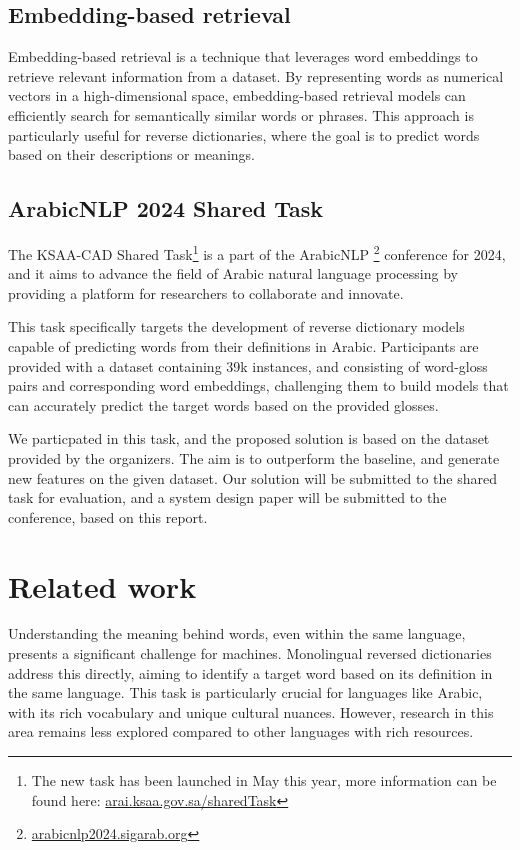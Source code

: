 \documentclass[12.5pt]{article}
\begin{document}
\subsection{Embedding-based retrieval}

Embedding-based retrieval is a technique that leverages word embeddings to retrieve relevant information from a dataset. By representing words as numerical vectors in a high-dimensional space, embedding-based retrieval models can efficiently search for semantically similar words or phrases. This approach is particularly useful for reverse dictionaries, where the goal is to predict words based on their descriptions or meanings.

\subsection{ArabicNLP 2024 Shared Task}\label{sec:arabicnlp}

The KSAA-CAD Shared Task\footnote{The new task has been launched in May this year, more information can be found here: \href{https://arai.ksaa.gov.sa/sharedTask2024/}{arai.ksaa.gov.sa/sharedTask}} is a part of the ArabicNLP \footnote{\href{https://arabicnlp2024.sigarab.org/}{arabicnlp2024.sigarab.org}} conference for 2024, and it aims to advance the field of Arabic natural language processing by providing a platform for researchers to collaborate and innovate. 

This task specifically targets the development of reverse dictionary models capable of predicting words from their definitions in Arabic. Participants are provided with a dataset containing 39k instances, and consisting of word-gloss pairs and corresponding word embeddings, challenging them to build models that can accurately predict the target words based on the provided glosses.

We particpated in this task, and the proposed solution is based on the dataset provided by the organizers. The aim is to outperform the baseline, and generate new features on the given dataset. Our solution will be submitted to the shared task for evaluation, and a system design paper will be submitted to the conference, based on this report.

\newpage

\section{Related work}

Understanding the meaning behind words, even within the same language, presents a significant challenge for machines. Monolingual reversed dictionaries address this directly, aiming to identify a target word based on its definition in the same language. This task is particularly crucial for languages like Arabic, with its rich vocabulary and unique cultural nuances. However, research in this area remains less explored compared to other languages with rich resources.
\end{document}
